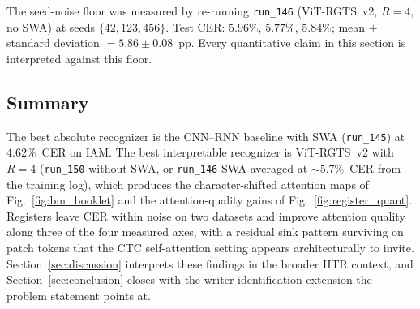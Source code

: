 The seed-noise floor was measured by re-running \texttt{run\_146} (ViT-RGTS~v2, $R = 4$, no SWA) at seeds $\{42, 123, 456\}$. Test CER: $5.96\%$, $5.77\%$, $5.84\%$; mean $\pm$ standard deviation $= 5.86 \pm 0.08$~pp. Every quantitative claim in this section is interpreted against this floor.

\subsection{Summary}
\label{sec:res_summary}

The best absolute recognizer is the CNN--RNN baseline with SWA (\texttt{run\_145}) at $4.62\%$~CER on IAM. The best interpretable recognizer is ViT-RGTS~v2 with $R = 4$ (\texttt{run\_150} without SWA, or \texttt{run\_146} SWA-averaged at ${\sim}5.7\%$~CER from the training log), which produces the character-shifted attention maps of Fig.~\ref{fig:bm_booklet} and the attention-quality gains of Fig.~\ref{fig:register_quant}. Registers leave CER within noise on two datasets and improve attention quality along three of the four measured axes, with a residual sink pattern surviving on patch tokens that the CTC self-attention setting appears architecturally to invite. Section~\ref{sec:discussion} interprets these findings in the broader HTR context, and Section~\ref{sec:conclusion} closes with the writer-identification extension the problem statement points at.
